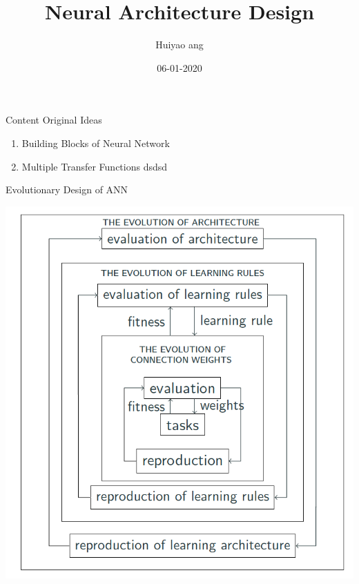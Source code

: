 \documentclass{beamer}
\title{Neural Architecture Design}
\author{Huiyao ang}
\institute{Kyoto Institue of Technology}
\date{06-01-2020}
\begin{document}
\begin{frame}
    \titlepage
\end{frame}

\begin{frame}[c]{Content} 
    Original Ideas
    \begin{enumerate}
        \item Building Blocks of Neural Network 
        \item Multiple Transfer Functions  dsdsd
    \end{enumerate}
\end{frame}

\begin{frame}{Evolutionary Design of ANN}
    \begin{center}
          \includegraphics[scale=0.22]{NAS/general-architecture.png}
    \end{center}
\end{frame}
\end{document}
